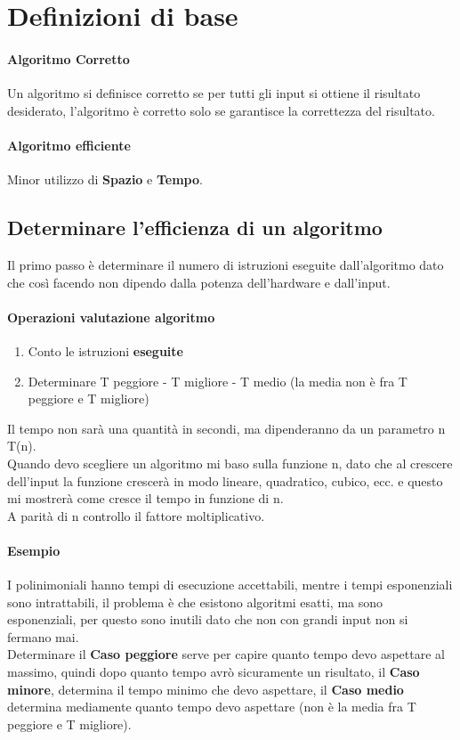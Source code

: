 \section{Definizioni di base}
\paragraph*{Algoritmo Corretto} Un algoritmo si definisce corretto se per tutti gli input si ottiene il 
risultato desiderato, l'algoritmo è corretto solo se garantisce la correttezza del risultato.
\paragraph*{Algoritmo efficiente} Minor utilizzo di \textbf{Spazio} e \textbf{Tempo}.

\subsection*{Determinare l'efficienza di un algoritmo}
Il primo passo è determinare il numero di istruzioni eseguite dall'algoritmo
dato che così facendo non dipendo dalla potenza dell'hardware
e dall'input.
\paragraph*{Operazioni valutazione algoritmo}
\begin{enumerate}
    \item Conto le istruzioni \textbf{eseguite}
    \item Determinare T peggiore - T migliore - T medio (la media non è fra
    T peggiore e T migliore)
\end{enumerate}
Il tempo non sarà una quantità in secondi, ma dipenderanno da un parametro
n T(n).
\\ Quando devo scegliere un algoritmo mi baso sulla funzione n, dato che al crescere
dell'input la funzione crescerà in modo lineare, quadratico, cubico, ecc. e 
questo mi mostrerà come cresce il tempo in funzione di n.
\\ A parità di n controllo il fattore moltiplicativo.
\paragraph*{Esempio} I polinimoniali hanno tempi di esecuzione accettabili,
mentre i tempi esponenziali sono intrattabili, il problema è che esistono algoritmi esatti,
ma sono esponenziali, per questo sono inutili dato che non con grandi input non
si fermano mai.
\\ Determinare il \textbf{Caso peggiore} serve per capire quanto tempo devo aspettare
al massimo, quindi dopo quanto tempo avrò sicuramente un risultato, il \textbf{Caso minore},
determina il tempo minimo che devo aspettare, il \textbf{Caso medio} determina mediamente
quanto tempo devo aspettare (non è la media fra T peggiore e T migliore).
 